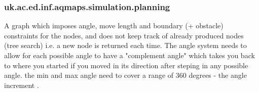 \subsubsection*{ uk.ac.ed.inf.aqmaps.simulation.planning }
 {\scriptsize A graph which imposes angle, move length and boundary (+ obstacle) constraints for the nodes, and does not keep track of already produced nodes (tree search) i.e. a new node is returned each time.\newline%
 The angle system needs to allow for each possible angle to have a "complement angle" which takes\newline%
 you back to where you started if you moved in its direction after steping in any possible angle.\newline%
 the min and max angle need to cover a range of 360 degrees {-} the angle increment .
 
}
